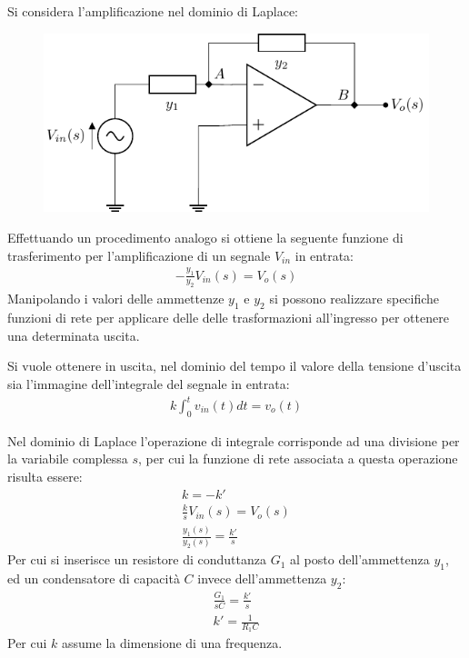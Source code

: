 \documentclass{article}
\numberwithin{equation}{subsection}
\begin{document}
Si considera l'amplificazione nel dominio di Laplace:
\begin{figure}[H]%
    \centering
    \includegraphics{amplificazione-invertente-laplace.pdf}%
    \label{fig:amplificazione-invertente-laplace}
\end{figure}

Effettuando un procedimento analogo si ottiene la seguente funzione di trasferimento per l'amplificazione di un segnale $V_{in}$ in entrata:
\begin{gather*}
    \displaystyle-\frac{y_1}{y_2}V_{in}(s)=V_o(s)
\end{gather*}
Manipolando i valori delle ammettenze $y_1$ e $y_2$ si possono realizzare specifiche funzioni di rete per applicare delle delle trasformazioni 
all'ingresso per ottenere una determinata uscita. 

Si vuole ottenere in uscita, nel dominio del tempo il valore della tensione d'uscita sia l'immagine dell'integrale del segnale in entrata:
\begin{gather*}
    \displaystyle k\int_{0}^tv_{in}(t)dt=v_o(t)
\end{gather*} 

Nel dominio di Laplace l'operazione di integrale corrisponde ad una divisione per la variabile complessa $s$, per cui la funzione di rete 
associata a questa operazione risulta essere:
\begin{gather*}
    k=-k'\\
    \displaystyle\frac{k}{s}V_{in}(s)=V_o(s)\\
    \displaystyle\frac{y_1(s)}{y_2(s)}=\frac{k'}{s}
\end{gather*}
Per cui si inserisce un resistore di conduttanza $G_1$ al posto dell'ammettenza $y_1$, ed un condensatore di capacità $C$ invece dell'ammettenza $y_2$:
\begin{gather*}
    \displaystyle\frac{G_1}{sC}=\frac{k'}{s}\\
    k'=\displaystyle\frac{1}{R_1C}
\end{gather*} 
Per cui $k$ assume la dimensione di una frequenza. 
\end{document}
